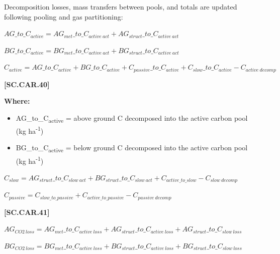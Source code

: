 Decomposition losses, mass transfers between pools, and totals are updated following pooling and gas partitioning:
          \begin{center}
\(AG\_to\_C_{active}=AG_{met}\_to\_C_{active\ act} + AG_{struct}\_to\_C_{active\ act}\)
\vspace{0.1cm}

\(BG\_to\_C_{active}=BG_{met}\_to\_C_{active\ act} + BG_{struct}\_to\_C_{active\ act}\)
\vspace{0.1cm}

\(C_{active} = AG\_to\_C_{active} + BG\_to\_C_{active} + C_{passive}\_to\_C_{active}+C_{slow}\_to\_C_{active}-C_{active\ decomp}\)
    \end{center}
        \vspace{0.5cm} 
    
            {\raggedleft \textbf{[SC.CAR.40]}\par}
            \vspace{0.5cm}

        \textbf{Where:}
            
        \begin{itemize}
            \item AG\_to\_C\textsubscript{active} = above ground C decomposed into the active carbon pool (kg ha\textsuperscript{-1})
            \item BG\_to\_C\textsubscript{active} = below ground C decomposed into the active carbon pool (kg ha\textsuperscript{-1})
        \end{itemize}
        \vspace{0.5cm}

    \begin{center}
\(C_{slow}=AG_{struct}\_to\_C_{slow\ act}+BG_{struct}\_to\_C_{slow\ act}+C_{active\_to\_slow}-C_{slow\ decomp}\)
\vspace{0.1cm}

\(C_{passive}=C_{slow\_to\_passive}+C_{active\_to\_passive}-C_{passive\ decomp}\)
    \end{center}
        \vspace{0.5cm} 
    
            {\raggedleft \textbf{[SC.CAR.41]}\par}
            \vspace{0.5cm}


    \begin{center}
\(AG_{CO2\ loss}=AG_{met}\_to\_C_{active\ loss}+AG_{struct}\_to\_C_{active\ loss}+AG_{struct}\_to\_C_{slow\ loss}\)
\vspace{0.1cm}

\(BG_{CO2\ loss}=BG_{met}\_to\_C_{active\ loss}+BG_{struct}\_to\_C_{active\ loss}+BG_{struct}\_to\_C_{slow\ loss}\)

    \end{center}
        \vspace{0.5cm} 
    
